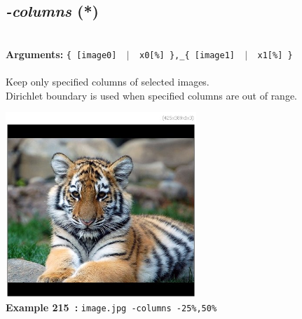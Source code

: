 \documentclass[a4paper,11pt,twoside]{book}
\begin{document}
\subsection{\emph{-columns} (*)}\vspace*{-0.5em}
~\\\textbf{Arguments: } 
{\small \texttt{\{ [image0] ~$|$~ x0[\%] \},\_\{ [image1] ~$|$~ x1[\%] \}}}\\~\\
Keep only specified columns of selected images.
~\\Dirichlet boundary is used when specified columns are out of range.
\begin{center}\includegraphics[keepaspectratio=true,height=7cm,width=\textwidth]{img/gmic_def215.jpg}\\
{\footnotesize \textbf{Example 215~:} \texttt{image.jpg -columns -25\%,50\%}}
\end{center}
\end{document}
